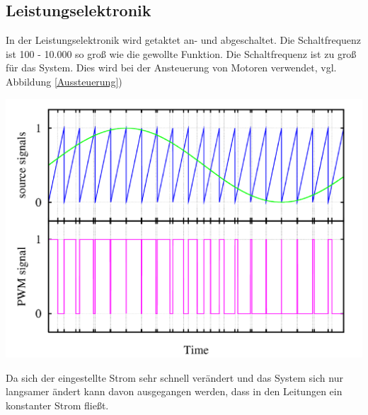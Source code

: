 \documentclass[10pt,a4paper,oneside,abstracton]{scrartcl}
\newenvironment{Figure}
  {\par\medskip\noindent\minipage{\linewidth}}
  {\endminipage\par\medskip}
\begin{document}
\begin{multicols}{2}
\subsection{Leistungselektronik}
In der Leistungselektronik wird getaktet an- und abgeschaltet. 
Die Schaltfrequenz ist 100 - 10.000 so groß wie die gewollte Funktion. 
Die Schaltfrequenz ist zu groß für das System. 
Dies wird bei der Ansteuerung von Motoren verwendet, vgl. Abbildung \ref*{Aussteuerung})
\begin{Figure}
	\includegraphics[width=\textwidth]{Bilder/BLDC_Aussteuerung.png}
	\label{Aussteuerung}
\end{Figure}
\noindent
Da sich der eingestellte Strom sehr schnell verändert und das System sich nur langsamer ändert 
kann davon ausgegangen werden, dass in den Leitungen ein konstanter Strom fließt. 



\end{multicols}
\end{document}
